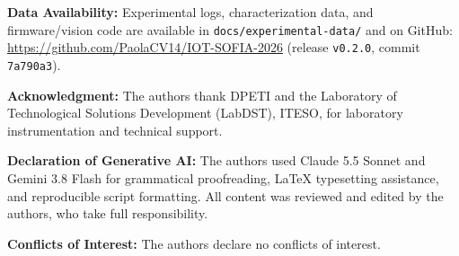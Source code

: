 \documentclass[lettersize,journal]{IEEEtran}
\begin{document}
	\noindent\textbf{Data Availability:} 
	Experimental logs, characterization data, and firmware/vision code
	are available in \texttt{docs/experimental-data/} and on GitHub:
	\url{https://github.com/PaolaCV14/IOT-SOFIA-2026}
	(release \texttt{v0.2.0}, commit \texttt{7a790a3}).
	
	\noindent\textbf{Acknowledgment:} 
	The authors thank DPETI and the Laboratory of Technological
	Solutions Development (LabDST), ITESO, for laboratory
	instrumentation and technical support.
	
	\noindent\textbf{Declaration of Generative AI:} 
	The authors used Claude 5.5 Sonnet and Gemini 3.8 Flash for
	grammatical proofreading, LaTeX typesetting assistance, and
	reproducible script formatting. All content was reviewed and
	edited by the authors, who take full responsibility.
	
	\noindent\textbf{Conflicts of Interest:}
	The authors declare no conflicts of interest.
	
	\normalsize
	
	\balance
	
	
	
\end{document}
